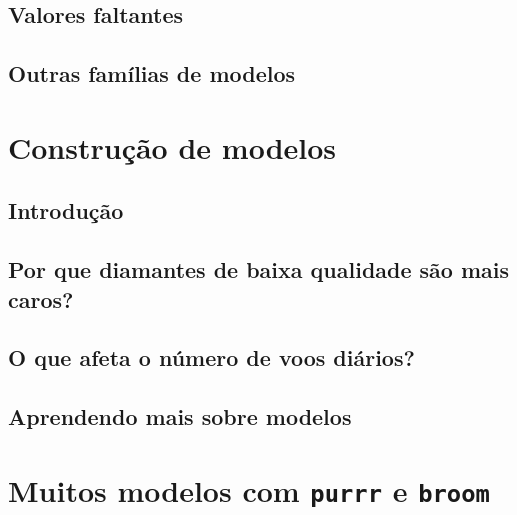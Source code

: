 \documentclass[
]{latex/krantz}
\theoremstyle{definition}
\theoremstyle{definition}
\theoremstyle{definition}
\theoremstyle{definition}
\theoremstyle{remark}
\begin{document}
\hypertarget{valores-faltantes-2}{%
\section{Valores faltantes}\label{valores-faltantes-2}}

\hypertarget{outras-famuxedlias-de-modelos}{%
\section{Outras famílias de modelos}\label{outras-famuxedlias-de-modelos}}

\hypertarget{construuxe7uxe3o-de-modelos}{%
\chapter{Construção de modelos}\label{construuxe7uxe3o-de-modelos}}

\hypertarget{introduuxe7uxe3o-15}{%
\section{Introdução}\label{introduuxe7uxe3o-15}}

\hypertarget{por-que-diamantes-de-baixa-qualidade-suxe3o-mais-caros}{%
\section{Por que diamantes de baixa qualidade são mais caros?}\label{por-que-diamantes-de-baixa-qualidade-suxe3o-mais-caros}}

\hypertarget{o-que-afeta-o-nuxfamero-de-voos-diuxe1rios}{%
\section{O que afeta o número de voos diários?}\label{o-que-afeta-o-nuxfamero-de-voos-diuxe1rios}}

\hypertarget{aprendendo-mais-sobre-modelos}{%
\section{Aprendendo mais sobre modelos}\label{aprendendo-mais-sobre-modelos}}

\hypertarget{muitos-modelos-com-purrr-e-broom}{%
\chapter{\texorpdfstring{Muitos modelos com \texttt{purrr} e \texttt{broom}}{Muitos modelos com purrr e broom}}\label{muitos-modelos-com-purrr-e-broom}}
\end{document}
